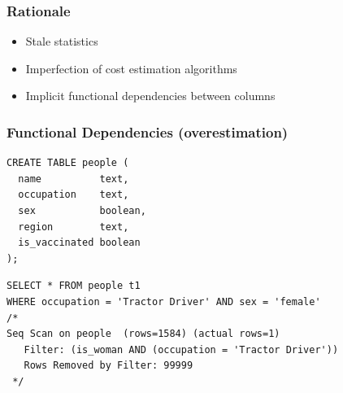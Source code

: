 \documentclass{beamer}
\begin{document}
\begin{frame}[fragile]\frametitle{Rationale}
\begin{itemize}
  \item Stale statistics
  \item Imperfection of cost estimation algorithms
  \item Implicit functional dependencies between columns
\end{itemize}
\end{frame}

\begin{frame}[fragile]\frametitle{Functional Dependencies (overestimation)}
\begin{lstlisting}[basicstyle=\footnotesize]
CREATE TABLE people (
  name          text,
  occupation    text,
  sex           boolean,
  region        text,
  is_vaccinated boolean
);
\end{lstlisting}
\begin{lstlisting}[basicstyle=\footnotesize]
SELECT * FROM people t1
WHERE occupation = 'Tractor Driver' AND sex = 'female'
/*
Seq Scan on people  (rows=1584) (actual rows=1)
   Filter: (is_woman AND (occupation = 'Tractor Driver'))
   Rows Removed by Filter: 99999
 */
\end{lstlisting}
\end{frame}
\end{document}
